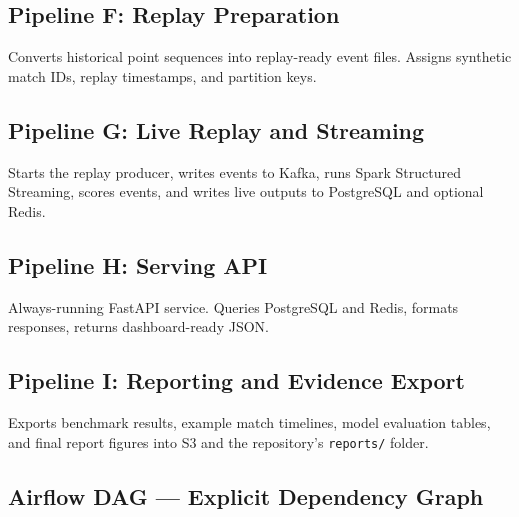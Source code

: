 \documentclass[11pt,a4paper]{article}
\begin{document}
\subsection{Pipeline F: Replay Preparation}
Converts historical point sequences into replay-ready event files. Assigns synthetic match IDs,
replay timestamps, and partition keys.

\subsection{Pipeline G: Live Replay and Streaming}
Starts the replay producer, writes events to Kafka, runs Spark Structured Streaming, scores
events, and writes live outputs to PostgreSQL and optional Redis.

\subsection{Pipeline H: Serving API}
Always-running FastAPI service. Queries PostgreSQL and Redis, formats responses, returns
dashboard-ready JSON.

\subsection{Pipeline I: Reporting and Evidence Export}
Exports benchmark results, example match timelines, model evaluation tables, and final report
figures into S3 and the repository's \texttt{reports/} folder.

\subsection{Airflow DAG --- Explicit Dependency Graph}
\end{document}
